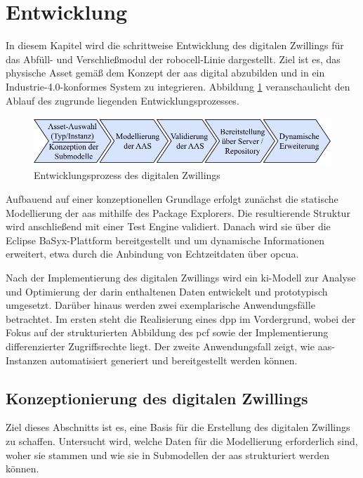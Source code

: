 \newpage
\section{Entwicklung}
\label{sec:Entwicklung}
In diesem Kapitel wird die schrittweise Entwicklung des digitalen Zwillings für das Abfüll- und Verschließmodul der robocell-Linie dargestellt.
Ziel ist es, das physische Asset gemäß dem Konzept der \acs{aas} digital abzubilden und in ein Industrie-4.0-konformes System zu integrieren.
Abbildung \ref{fig:Entwicklungsschritte} veranschaulicht den Ablauf des zugrunde liegenden Entwicklungsprozesses.

\begin{figure}[htbp]
    \centering
    \includegraphics[width=1\textwidth]{Bilder/vorgehenEntwicklungsteil.pdf}
    \caption[Entwicklungsprozess des digitalen Zwillings]{Entwicklungsprozess des digitalen Zwillings}
    \label{fig:Entwicklungsschritte}
\end{figure}
\vspace{-0.5em}

Aufbauend auf einer konzeptionellen Grundlage erfolgt zunächst die statische Modellierung der \acs{aas} mithilfe des Package Explorers.
Die resultierende Struktur wird anschließend mit einer Test Engine validiert.
Danach wird sie über die Eclipse BaSyx-Plattform bereitgestellt und um dynamische Informationen erweitert, etwa durch die Anbindung von Echtzeitdaten über \acs{opcua}.

Nach der Implementierung des digitalen Zwillings wird ein \acs{ki}-Modell zur Analyse und Optimierung der darin enthaltenen Daten entwickelt und prototypisch umgesetzt. 
Darüber hinaus werden zwei exemplarische Anwendungsfälle betrachtet. 
Im ersten steht die Realisierung eines \acs{dpp} im Vordergrund, wobei der Fokus auf der strukturierten Abbildung des \ac{pcf} sowie der Implementierung differenzierter Zugriffsrechte liegt. 
Der zweite Anwendungsfall zeigt, wie \acs{aas}-Instanzen automatisiert generiert und bereitgestellt werden können.

\subsection{Konzeptionierung des digitalen Zwillings}
Ziel dieses Abschnitts ist es, eine Basis für die Erstellung des digitalen Zwillings zu schaffen. 
Untersucht wird, welche Daten für die Modellierung erforderlich sind, woher sie stammen und wie sie in Submodellen der \acs{aas} strukturiert werden können.

